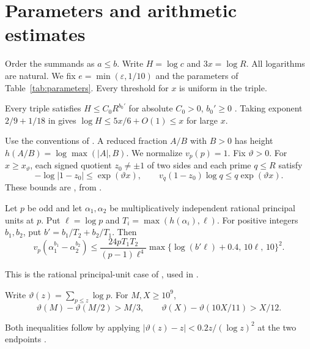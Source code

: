 \section{Parameters and arithmetic estimates}\label{sec:inputs}

Order the summands as $a\le b$. Write $H=\log c$ and $3x=\log R$.
All logarithms are natural. We fix $e=\min(\varepsilon,1/10)$ and
the parameters of Table~\ref{tab:parameters}. Every threshold for $x$
is uniform in the triple.
\fixedparameters

Every triple satisfies $H\le C_0R^{b_0'}$ for absolute $C_0>0$,
$b_0'\ge0$ \cite[Proposition~2.1]{Z29}. Taking exponent $2/9+1/18$
in \cite[Theorem~1.1]{Z29} gives $\log H\le 5x/6+O(1)\le x$
for large $x$.

Use the conventions of \cite[Section~2]{Z29}. A reduced fraction
$A/B$ with $B>0$ has height $h(A/B)=\log\max(|A|,B)$.
We normalize $v_p(p)=1$. Fix $\vartheta>0$. For $x\ge x_\vartheta$,
each signed quotient $z_0\ne\pm1$ of two sides and each prime $q\le R$ satisfy
\begin{equation}\label{eq:local}
 -\log|1-z_0|\le \exp(\vartheta x),\qquad
 v_q(1-z_0)\log q\le q\exp(\vartheta x).
\end{equation}
These bounds are \cite[Section~3, Fact~F2]{Z29}, from
\cite[Fact~F3, Lemma~2.1 and (2.8)]{ZhangThird}.

\begin{fact}\label{fact:bl}
Let $p$ be odd and let $\alpha_1,\alpha_2$ be multiplicatively
independent rational principal units at $p$. Put $\ell=\log p$ and
$T_i=\max(h(\alpha_i),\ell)$. For positive integers $b_1,b_2$, put
$b'=b_1/T_2+b_2/T_1$. Then
\begin{equation}\label{eq:bl}
 v_p(\alpha_1^{b_1}-\alpha_2^{b_2})\le
 \frac{24p T_1T_2}{(p-1)\ell^4}
 \max\{\log(b'\ell)+0.4,\,10\ell,\,10\}^2 .
\end{equation}
\end{fact}
This is the rational principal-unit case of
\cite[Corollary~2]{BL96}, used in \cite[proof of Proposition~6.1]{Z29}.

\begin{fact}\label{fact:primes}
Write $\vartheta(z)=\sum_{p\le z}\log p$. For $M,X\ge10^9$,
\[
 \vartheta(M)-\vartheta(M/2)>M/3,\qquad
 \vartheta(X)-\vartheta(10X/11)>X/12 .
\]
\end{fact}
Both inequalities follow by applying
$|\vartheta(z)-z|<0.2z/(\log z)^2$ at the two endpoints
\cite[Theorem~5.2]{Dusart}.

